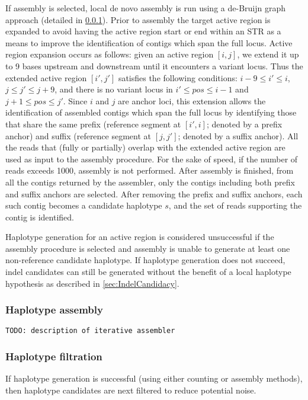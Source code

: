 \documentclass{article}
\begin{document}
If assembly is selected, local de novo assembly is run using a de-Bruijn graph approach (detailed in \ref{sec:HaplotypeAssembler}). Prior to assembly the target active region is expanded to avoid having the active region start or end within an STR as a means to improve the identification of contigs which span the full locus. Active region expansion occurs as follows: given an active region $[i,j]$, we extend it up to 9 bases upstream and downstream until it encounters a variant locus. Thus the extended active region $[i',j']$ satisfies the following conditions: $i-9 \leq i' \leq i$, $j \leq j' \leq j+9$, and there is no variant locus in $i' \leq pos \leq i-1$ and $j+1 \leq pos \leq j'$. Since $i$ and $j$ are anchor loci, this extension allows the identification of assembled contigs which span the full locus by identifying those that share the same prefix (reference segment at $[i',i]$; denoted by a prefix anchor) and suffix (reference segment at $[j,j']$; denoted by a suffix anchor). All the reads that (fully or partially) overlap with the extended active region are used as input to the assembly procedure. For the sake of speed, if the number of reads exceeds 1000, assembly is not performed. After assembly is finished, from all the contigs returned by the assembler, only the contigs including both prefix and suffix anchors are selected. After removing the prefix and suffix anchors, each such contig becomes a candidate haplotype $s$, and the set of reads supporting the contig is identified.

Haplotype generation for an active region is considered unsuccessful if the assembly procedure is selected and assembly is unable to generate at least one non-reference candidate haplotype. If haplotype generation does not succeed, indel candidates can still be generated without the benefit of a local haplotype hypothesis as described in \ref{sec:IndelCandidacy}.

\subsubsection{Haplotype assembly}
\label{sec:HaplotypeAssembler}
{\tt TODO: description of iterative assembler}

\subsubsection{Haplotype filtration}

If haplotype generation is successful (using either counting or assembly methods), then haplotype candidates are next filtered to reduce potential noise. 
\end{document}
